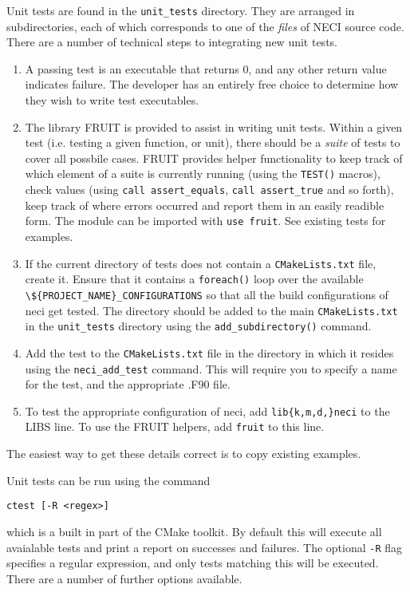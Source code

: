 \documentclass[a4paper,notitlepage]{scrreprt}
\let\code\lstinline
\begin{document}
{{{    Unit tests are found in the \code{unit_tests} directory. They are arranged in subdirectories,
    each of which corresponds to one of the \emph{files} of NECI source code. There are a number
    of technical steps to integrating new unit tests.
    \begin{enumerate}
        \item
            A passing test is an executable that returns 0, and any other return value indicates
            failure. The developer has an entirely free choice to determine how they wish to
            write test executables.
        \item
            The library FRUIT is provided to assist in writing unit tests. Within a given test
            (i.e. testing a given function, or unit), there should be a \emph{suite} of tests
            to cover all possbile cases. FRUIT provides helper functionality to keep track of
            which element of a suite is currently running (using the \code{TEST()} macros),
            check values (using \code{call assert_equals}, \code{call assert_true} and so forth),
            keep track of where errors occurred and report them in an easily readible form. The
            module can be imported with \code{use fruit}. See existing tests for examples.
        \item
            If the current directory of tests does not contain a \code{CMakeLists.txt} file, create it.
            Ensure that it contains a \code{foreach()} loop over the available
            \code|\${PROJECT_NAME}_CONFIGURATIONS| so that all the build configurations of
            neci get tested. The directory should be added to the main \code{CMakeLists.txt} in
            the \code{unit_tests} directory using the \code{add_subdirectory()} command.
        \item
            Add the test to the \code{CMakeLists.txt} file in the directory in which it resides
            using the \code{neci_add_test} command. This will require you to specify a name for
            the test, and the appropriate .F90 file.
        \item
            To test the appropriate configuration of neci, add \code|lib{k,m,d,}neci| to the
            LIBS line. To use the FRUIT helpers, add \code{fruit} to this line.
    \end{enumerate}
    The easiest way to get these details correct is to copy existing examples.

    Unit tests can be run using the command
    \begin{lstlisting}[gobble=4]
        ctest [-R <regex>]
    \end{lstlisting}
    which is a built in part of the CMake toolkit. By default this will execute all avaialable
    tests and print a report on successes and failures. The optional \code{-R} flag specifies
    a regular expression, and only tests matching this will be executed. There are a number
    of further options available.

}}}
\end{document}

